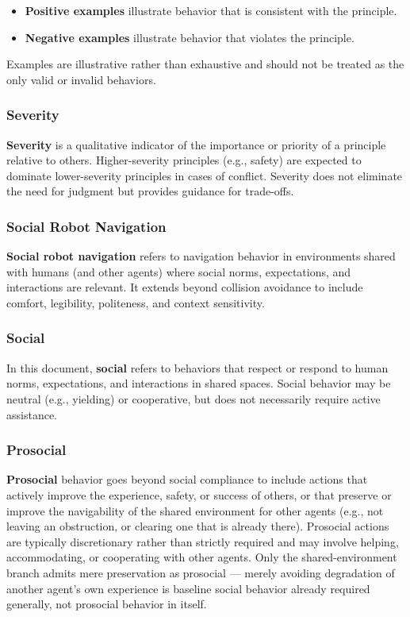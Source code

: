 \documentclass[utf8]{frontiers_suppmat} %
\providecommand{\tightlist}{%
  \setlength{\itemsep}{0pt}\setlength{\parskip}{0pt}}
\begin{document}
\begin{itemize}
\tightlist
\item
  \textbf{Positive examples} illustrate behavior that is consistent with
  the principle.
\item
  \textbf{Negative examples} illustrate behavior that violates the
  principle.
\end{itemize}

Examples are illustrative rather than exhaustive and should not be
treated as the only valid or invalid behaviors.

\subsubsection{Severity}\label{severity}

\textbf{Severity} is a qualitative indicator of the importance or
priority of a principle relative to others. Higher-severity principles
(e.g., safety) are expected to dominate lower-severity principles in
cases of conflict. Severity does not eliminate the need for judgment but
provides guidance for trade-offs.

\subsubsection{Social Robot Navigation}\label{social-robot-navigation}

\textbf{Social robot navigation} refers to navigation behavior in
environments shared with humans (and other agents) where social norms,
expectations, and interactions are relevant. It extends beyond collision
avoidance to include comfort, legibility, politeness, and context
sensitivity.

\subsubsection{Social}\label{social}

In this document, \textbf{social} refers to behaviors that respect or
respond to human norms, expectations, and interactions in shared spaces.
Social behavior may be neutral (e.g., yielding) or cooperative, but does
not necessarily require active assistance.

\subsubsection{Prosocial}\label{prosocial}

\textbf{Prosocial} behavior goes beyond social compliance to include
actions that actively improve the experience, safety, or success of
others, or that preserve or improve the navigability of the shared
environment for other agents (e.g., not leaving an obstruction, or
clearing one that is already there). Prosocial actions are typically
discretionary rather than strictly required and may involve helping,
accommodating, or cooperating with other agents. Only the
shared-environment branch admits mere preservation as prosocial ---
merely avoiding degradation of another agent's own experience is
baseline social behavior already required generally, not prosocial
behavior in itself.
\end{document}
